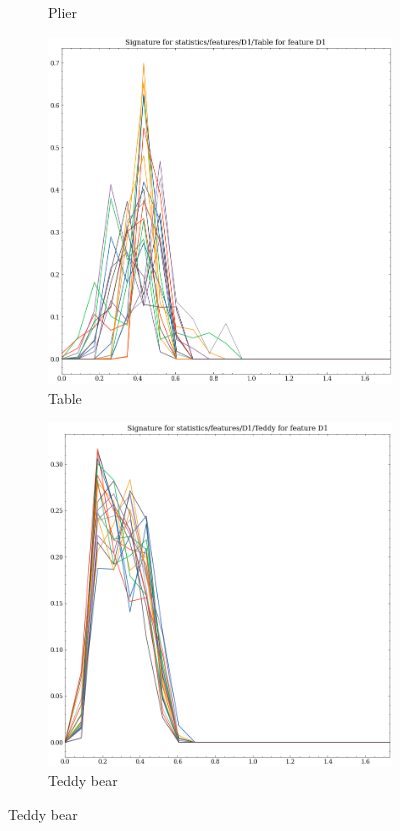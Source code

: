 \begin{figure}
\begin{subfigure}[b]{0.23\textwidth}
        \caption{Plier}
        \label{fig:features-statistics-D1-v}    
    \end{subfigure}
    \hfill
    \begin{subfigure}[b]{0.23\textwidth}
        \includegraphics[width=\textwidth]{assets/feature_extraction/D1/Table.png}
        \caption{Table}
        \label{fig:features-statistics-D1-w}    
    \end{subfigure}
    \hfill
    \begin{subfigure}[b]{0.23\textwidth}
        \includegraphics[width=\textwidth]{assets/feature_extraction/D1/Teddy.png}
        \caption{Teddy bear}
        \label{fig:features-statistics-D1-x}    
    \end{subfigure}
    \hfill


\end{figure}
